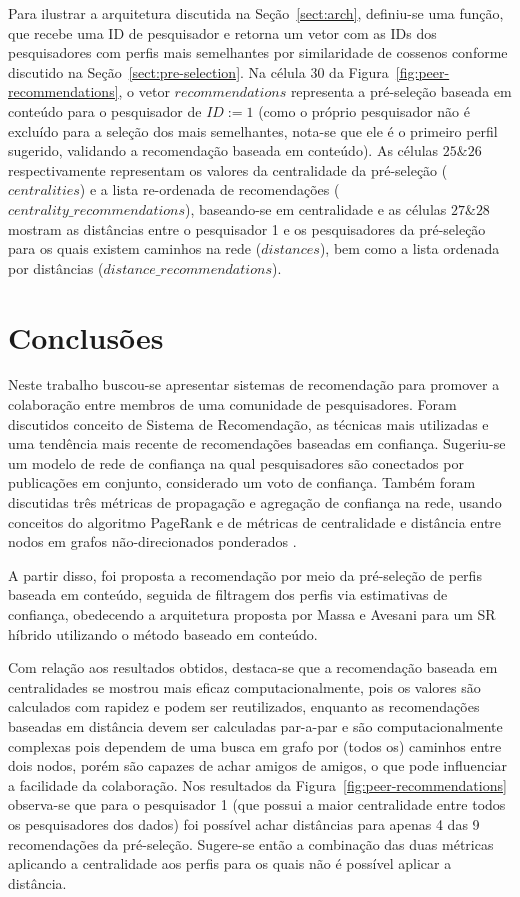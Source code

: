 \documentclass[12pt]{article}
\begin{document}
Para ilustrar a arquitetura discutida na Seção~\ref{sect:arch}, definiu-se uma função, que recebe uma ID de pesquisador e retorna um vetor com as IDs dos pesquisadores com perfis mais semelhantes por similaridade de cossenos conforme discutido na Seção~\ref{sect:pre-selection}. Na célula $30$ da Figura~\ref{fig:peer-recommendations}, o vetor $recommendations$ representa a pré-seleção baseada em conteúdo para o pesquisador de $ID:=1$ (como o próprio pesquisador não é excluído para a seleção dos mais semelhantes, nota-se que ele é o primeiro perfil sugerido, validando a recomendação baseada em conteúdo). As células $25 \& 26$ respectivamente representam os valores da centralidade da pré-seleção ($centralities$) e a lista re-ordenada de recomendações ($centrality\_recommendations$), baseando-se em centralidade e as células $27 \& 28$ mostram as distâncias entre o pesquisador 1 e os pesquisadores da pré-seleção para os quais existem caminhos na rede ($distances$), bem como a lista ordenada por distâncias ($distance\_recommendations$).

\section{Conclusões}

Neste trabalho buscou-se apresentar sistemas de recomendação para promover a colaboração entre membros de uma comunidade de pesquisadores. Foram discutidos conceito de Sistema de Recomendação, as técnicas mais utilizadas e uma tendência mais recente de recomendações baseadas em confiança. Sugeriu-se um modelo de rede de confiança na qual pesquisadores são conectados por publicações em conjunto, considerado um voto de confiança. Também foram discutidas três métricas de propagação e agregação de confiança  na rede, usando conceitos do algoritmo PageRank \cite{page1999pagerank} e de métricas de centralidade e distância entre nodos em grafos não-direcionados ponderados \cite{opsahl2010node}.

A partir disso, foi proposta a recomendação por meio da pré-seleção de perfis baseada em conteúdo, seguida de filtragem dos perfis via estimativas de confiança, obedecendo a arquitetura proposta por Massa e Avesani \cite{massa2004trust} para um SR híbrido utilizando o método baseado em conteúdo. 

Com relação aos resultados obtidos, destaca-se que a recomendação baseada em centralidades se mostrou mais eficaz computacionalmente, pois os valores são calculados com rapidez e podem ser reutilizados, enquanto as recomendações baseadas em distância devem ser calculadas par-a-par e são computacionalmente complexas pois dependem de uma busca em grafo por (todos os) caminhos entre dois nodos, porém são capazes de achar amigos de amigos, o que pode influenciar a facilidade da colaboração. Nos resultados da Figura~\ref{fig:peer-recommendations} observa-se que para o pesquisador 1 (que possui a maior centralidade entre todos os pesquisadores dos dados) foi possível achar distâncias para apenas 4 das 9 recomendações da pré-seleção. Sugere-se então a combinação das duas métricas aplicando a centralidade aos perfis para os quais não é possível aplicar a distância.
\end{document}
